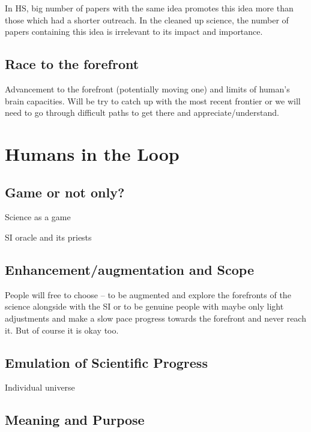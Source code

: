 \documentclass[a4paper,11pt]{article}
\begin{document}
        In HS, big number of papers with the same idea promotes this idea more than those which had a shorter outreach. In the cleaned up science, the number of papers containing this idea is irrelevant to its impact and importance. 

        \subsection{Race to the forefront}

        Advancement to the forefront (potentially moving one) and limits of human's brain capacities. Will be try to catch up with the most recent frontier or we will need to go through difficult paths to get there and appreciate/understand.

    \section{Humans in the Loop}

        \subsection{Game or not only?}

        Science as a game

        SI oracle and its priests

        \subsection{Enhancement/augmentation and Scope}






        People will free to choose -- to be augmented and explore the forefronts of the science alongside with the SI or to be genuine people with maybe only light adjustments and make a slow pace progress towards the forefront and never reach it. But of course it is okay too.

        \subsection{Emulation of Scientific Progress}

        Individual universe

        \subsection{Meaning and Purpose}






\printbibliography
\end{document}
